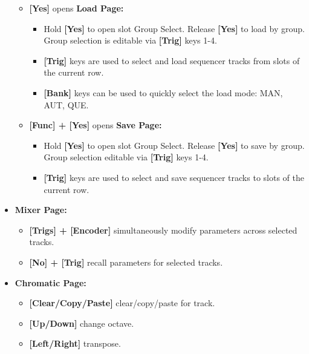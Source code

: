 \begin{itemize}
\begin{itemize}
\item \textbf{[Yes]} opens \textbf{Load Page:}
    \begin{itemize}
    \item Hold \textbf{[Yes]} to open slot Group Select. Release \textbf{[Yes]} to load by group. Group selection is editable via \textbf{[Trig]} keys 1-4.
    \item \textbf{[Trig]} keys are used to select and load sequencer tracks from slots of the current row.
    \item \textbf{[Bank]} keys can be used to quickly select the load mode: MAN, AUT, QUE.
    \end{itemize}
    
\item \textbf{[Func] + [Yes]} opens \textbf{Save Page:}
    \begin{itemize}
    \item Hold \textbf{[Yes]} to open slot Group Select. Release \textbf{[Yes]} to save by group.  Group selection editable via \textbf{[Trig]} keys 1-4.
    \item \textbf{[Trig]} keys are used to select and save sequencer tracks to slots of the current row.
    \end{itemize}
\end{itemize}

\item \textbf{Mixer Page:}
      \begin{itemize}
       \item \textbf{[Trigs] + [Encoder]} simultaneously modify parameters across selected tracks. 
      \item \textbf{[No] + [Trig]} recall parameters for selected tracks.
       \end{itemize}
\newpage
\item \textbf{Chromatic Page:}
      \begin{itemize}
      \item \textbf{[Clear/Copy/Paste]} clear/copy/paste for track.
      \item \textbf{[Up/Down]} change octave.
      \item \textbf{[Left/Right]} transpose.
      \end{itemize}


\end{itemize}

